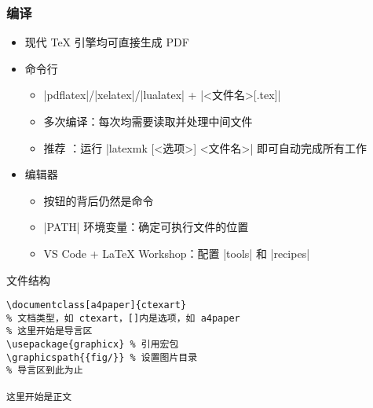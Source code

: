 \begin{frame}[fragile]
  \frametitle{编译}
  \begin{itemize}
    \item 现代 \TeX{} 引擎均可直接生成 PDF
    \item 命令行

      \begin{itemize}
        \item |pdflatex|/|xelatex|/|lualatex| + |<文件名>[.tex]|
        \item 多次编译：每次均需要读取并处理中间文件
        \item 推荐 ：运行 |latexmk [<选项>] <文件名>| 即可自动完成所有工作
      \end{itemize}

    \item 编辑器

      \begin{itemize}
        \item 按钮的背后仍然是命令
        \item |PATH| 环境变量：确定可执行文件的位置
        \item VS Code + \LaTeX{} Workshop：配置 |tools| 和 |recipes|
      \end{itemize}
  \end{itemize}
\end{frame}


\begin{frame}[fragile]{文件结构}
  \lstset{language=[LaTeX]TeX}
  \begin{lstlisting}[basicstyle=\ttfamily]
\documentclass[a4paper]{ctexart}
% 文档类型，如 ctexart，[]内是选项，如 a4paper
% 这里开始是导言区
\usepackage{graphicx} % 引用宏包
\graphicspath{{fig/}} % 设置图片目录
% 导言区到此为止

这里开始是正文

  \end{lstlisting}
\end{frame}

